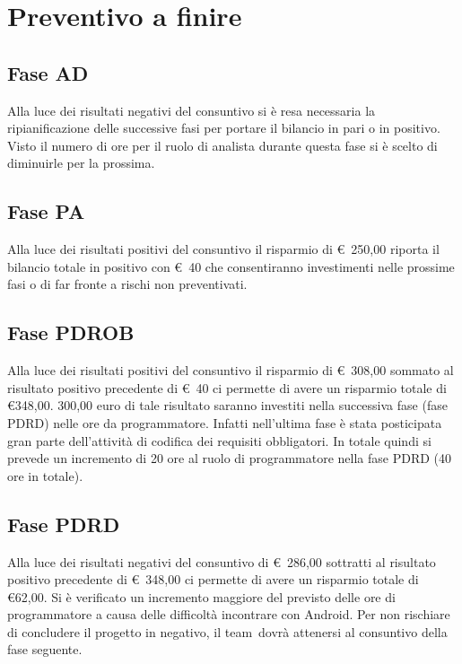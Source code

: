 \documentclass[../PianoProgetto.tex]{subfiles}
\begin{document}
\section{Preventivo a finire}

	\subsection{Fase AD}
		Alla luce dei risultati negativi del consuntivo si è resa necessaria la ripianificazione delle successive fasi per portare il bilancio in pari o in positivo. Visto il numero di ore per il ruolo di analista durante questa fase si è scelto di diminuirle per la prossima.
	
	\subsection{Fase PA}
		Alla luce dei risultati positivi del consuntivo il risparmio di \euro\ 250,00 riporta il bilancio totale in positivo con \euro\ 40 che consentiranno investimenti nelle prossime fasi o di far fronte a rischi non preventivati.
	
	\subsection{Fase PDROB}
		Alla luce dei risultati positivi del consuntivo il risparmio di \euro\ 308,00 sommato al risultato positivo precedente di \euro\ 40 ci permette di avere un risparmio totale di \euro 348,00. 300,00 euro di tale risultato saranno investiti nella successiva fase (fase PDRD) nelle ore da programmatore. Infatti nell'ultima fase è stata posticipata gran parte dell'attività di codifica dei requisiti obbligatori. In totale quindi si prevede un incremento di 20 ore al ruolo di programmatore nella fase PDRD (40 ore in totale).
	
	\subsection{Fase PDRD}
		Alla luce dei risultati negativi del consuntivo di \euro\ 286,00 sottratti al risultato positivo precedente di \euro\ 348,00 ci permette di avere un risparmio totale di \euro 62,00. Si è verificato un incremento maggiore del previsto delle ore di programmatore a causa delle difficoltà incontrare con Android\g. Per non rischiare di concludere il progetto in negativo, il team\g\ dovrà attenersi al consuntivo della fase seguente.
	
\end{document}

